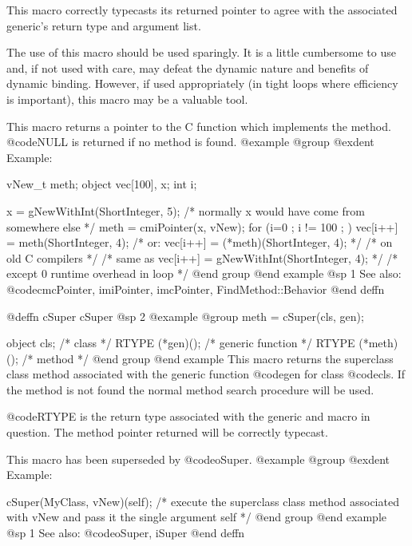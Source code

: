 {{{{This macro correctly typecasts its returned pointer to agree with
the associated generic's return type and argument list.

The use of this macro should be used sparingly.  It is a little
cumbersome to use and, if not used with care, may defeat the dynamic
nature and benefits of dynamic binding.  However, if used appropriately
(in tight loops where efficiency is important), this macro may be
a valuable tool.

This macro returns a pointer to the C function which implements the method.
@code{NULL} is returned if no method is found.
@example
@group
@exdent Example:

vNew_t    meth;
object  vec[100], x;
int     i;

x = gNewWithInt(ShortInteger, 5);
/* normally x would have come from somewhere else  */
meth = cmiPointer(x, vNew);
for (i=0 ; i != 100 ; )
        vec[i++] = meth(ShortInteger, 4);
/* or:  vec[i++] = (*meth)(ShortInteger, 4); */
         /*  on old C compilers */
/* same as vec[i++] = gNewWithInt(ShortInteger, 4);  */
/* except 0 runtime overhead in loop          */
@end group
@end example
@sp 1
See also:  @code{cmcPointer, imiPointer, imcPointer, FindMethod::Behavior}
@end deffn











@deffn {cSuper} cSuper
@sp 2
@example
@group
meth = cSuper(cls, gen);

object  cls;            /*  class               */
RTYPE   (*gen)();       /*  generic function    */
RTYPE   (*meth)();      /*  method              */
@end group
@end example
This macro returns the superclass class method associated with the
generic function @code{gen} for class @code{cls}.  If the method is not
found the normal method search procedure will be used.

@code{RTYPE} is the return type associated with the generic and
macro in question.  The method pointer returned will be correctly
typecast.

This macro has been superseded by @code{oSuper}.
@example
@group
@exdent Example:

cSuper(MyClass, vNew)(self);  /* execute the superclass class
                                 method associated with vNew
                                 and pass it the single 
                                 argument self  */
@end group
@end example
@sp 1
See also:  @code{oSuper, iSuper}
@end deffn












}}}}
